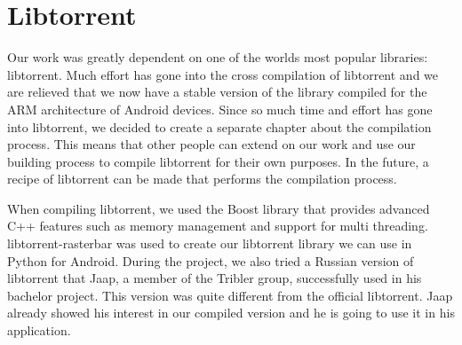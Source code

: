\section{Libtorrent}
	Our work was greatly dependent on one of the worlds most popular libraries: libtorrent. Much effort has gone into the cross compilation of libtorrent and we are relieved that we now have a stable version of the library compiled for the ARM architecture of Android devices. Since so much time and effort has gone into libtorrent, we decided to create a separate chapter about the compilation process. This means that other people can extend on our work and use our building process to compile libtorrent for their own purposes. In the future, a recipe of libtorrent can be made that performs the compilation process.
	
	When compiling libtorrent, we used the Boost library that provides advanced C++ features such as memory management and support for multi threading. libtorrent-rasterbar was used to create our libtorrent library we can use in Python for Android. During the project, we also tried a Russian version of libtorrent that Jaap, a member of the Tribler group, successfully used in his bachelor project. This version was quite different from the official libtorrent. Jaap already showed his interest in our compiled version and he is going to use it in his application.